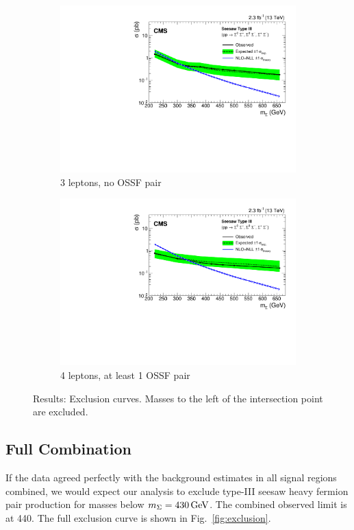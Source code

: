 \begin{figure}
\begin{center}
\begin{subfigure}[b]{.5\textwidth}
		\includegraphics[width=\textwidth]{Results/exclusion-L3DY0}
		\caption{3 leptons, no OSSF pair}
	\end{subfigure}%
	\begin{subfigure}[b]{.5\textwidth}
		\includegraphics[width=\textwidth]{Results/exclusion-L4DYgt0}
		\caption{4 leptons, at least 1 OSSF pair}
	\end{subfigure}%
	\caption{Results: Exclusion curves. Masses to the left of the intersection point are excluded.
	\label{fig:exclusions}}
\end{center}
\end{figure}

\subsection{Full Combination}
If the data agreed perfectly with the background estimates in all signal regions combined, we would expect our analysis to exclude type-III seesaw heavy fermion pair production for masses below $m_\Sigma = 430\,\text{Ge\hspace{-.08em}V}$. The combined observed limit is at 440\GeV. The full exclusion curve is shown in Fig.~\ref{fig:exclusion}.

